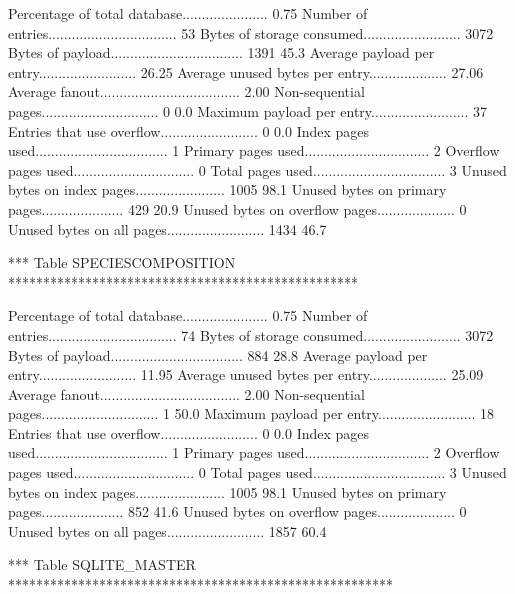 Percentage of total database......................   0.75%
Number of entries................................. 53        
Bytes of storage consumed......................... 3072      
Bytes of payload.................................. 1391        45.3%
Average payload per entry......................... 26.25     
Average unused bytes per entry.................... 27.06     
Average fanout.................................... 2.00      
Non-sequential pages.............................. 0            0.0%
Maximum payload per entry......................... 37        
Entries that use overflow......................... 0            0.0%
Index pages used.................................. 1         
Primary pages used................................ 2         
Overflow pages used............................... 0         
Total pages used.................................. 3         
Unused bytes on index pages....................... 1005        98.1%
Unused bytes on primary pages..................... 429         20.9%
Unused bytes on overflow pages.................... 0         
Unused bytes on all pages......................... 1434        46.7%

*** Table SPECIESCOMPOSITION **************************************************

Percentage of total database......................   0.75%
Number of entries................................. 74        
Bytes of storage consumed......................... 3072      
Bytes of payload.................................. 884         28.8%
Average payload per entry......................... 11.95     
Average unused bytes per entry.................... 25.09     
Average fanout.................................... 2.00      
Non-sequential pages.............................. 1           50.0%
Maximum payload per entry......................... 18        
Entries that use overflow......................... 0            0.0%
Index pages used.................................. 1         
Primary pages used................................ 2         
Overflow pages used............................... 0         
Total pages used.................................. 3         
Unused bytes on index pages....................... 1005        98.1%
Unused bytes on primary pages..................... 852         41.6%
Unused bytes on overflow pages.................... 0         
Unused bytes on all pages......................... 1857        60.4%

*** Table SQLITE_MASTER *******************************************************

